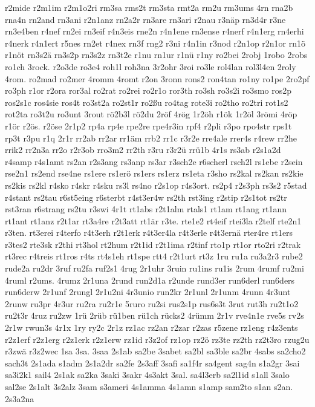 {r2mide
r2m1im
r2m1o2ri
rm3sa
rms2t
rm3sta
rmt2a
rm2u
rm3ums
4rn
rna2b
rna4n
rn2and
rn3ani
r2n1anz
rn2a2r
rn3are
rn3ari
r2nau
r3näp
rn3d4r
r3ne
rn3e4ben
r4nef
rn2ei
rn3eif
r4n3eis
rne2n
r4n1ene
rn3ense
r4nerf
r4n1erg
rn4erhi
r4nerk
r4n1ert
r5nes
rn2et
r4nex
rn3f
rng2
r3ni
r4n1in
r3nod
r2n1op
r2n1or
rn1ö
r1nöt
rn3s2ä
rn3s2p
rn3s2z
rn3t2e
r1nu
rn1ur
r1nü
r1ny
ro2bei
2robj
1robo
2robs
ro1ch
3rock.
r2o3de
ro3e4
roh1l
roh3na
3r2ohr
3roi
ro3le
rol4lan
rol3l4en
2roly
4rom.
ro2mad
ro2mer
4romm
4romt
r2on
3ronn
rons2
ron4tan
ro1ny
ro1pe
2ro2pf
ro3ph
r1or
r2ora
ror3al
ro2rat
ro2rei
ro2r1o
ror3th
ro3sh
ro3s2i
ro3smo
ros2p
ros2s1c
ros4sie
ros4t
ro3st2a
ro2st1r
ro2ßu
ro4tag
rote3i
ro2tho
ro2tri
rot1s2
rot2ta
ro3t2u
ro3unt
3rout
rö2b3l
rö2du
2röf
4rög
1r2öh
r1ök
1r2öl
3römi
4röp
r1ör
r2ös.
r2öse
2r1p2
rp4a
rp4e
rpe2re
rpe4r3in
rpf4
r2pli
r3po
rpo4str
rps1t
rp3t
r3pu
r1q
2r1r
rr2ab
rr2ar
rr1äm
rrb2
rr1c
r3r2e
rre4ale
rrer4s
r4rew
rr2he
rrik2
rr2n3a
rr2o
r2r3ob
rro3m2
rr2th
r3ru
r3r2ü
rrü1b
4r1s
rs3ab
r2s1a2d
r4samp
r4s1amt
rs2an
r2s3ang
rs3anp
rs3ar
r3sch2e
r6scherl
rsch2l
rs1ebe
r2sein
rse2n1
rs2end
rse4ne
rs1ere
rs1erö
rs1ers
rs1erz
rs1eta
r3sho
rs2kal
rs2kan
rs2kie
rs2kis
rs2kl
r4sko
r4skr
r4sku
rs3l
rs4no
r2s1op
r4s3ort.
rs2p4
r2s3ph
rs3s2
r5stad
r4stant
rs2tau
r6st5eing
r6sterbt
r4st3er4w
rs2th
rst3ing
r2stip
r2s1tot
rs2tr
rst3ran
r6strang
rs2tu
r3swi
4r1t
rt1abs
r2t1alm
rtals1
rt1am
rt1ang
rt1ann
rt1ant
rt1anz
r2t1ar
rt3a4re
r2t3att
rt1är
r3te.
rte1e2
rt4eif
rtei3la
r2telf
rte2n1
r3ten.
rt3erei
r4terfo
r4t3erh
r2t1erk
r4t3er4la
r4t3erle
r4t3ernä
rter4re
rt1ers
r3tes2
rte3sk
r2thi
rt3hol
rt2hum
r2t1id
r2t1ima
r2tinf
rto1p
rt1or
rto2ri
r2trak
rt3rec
r4treis
rt1ros
r4ts
rt4s1eh
rt1spe
rtt4
r2t1urt
rt3z
1ru
ru1a
ru3a2r3
rube2
rude2a
ru2dr
3ruf
ru2fa
ruf2s1
4rug
2r1uhr
3ruin
ru1ins
ru1is
2rum
4rumf
ru2mi
4ruml
r2ums.
4rumz
2r1una
2rund
run2d1a
r2unde
rund3er
run6derl
run6ders
run6derw
2r1unf
2rungl
2r1u2ni
4r3unio
run2kr
2r1unl
2r1unm
4runn
4r3unt
2runw
ru3pr
4r3ur
ru2ra
ru2r1e
5ruro
ru2si
rus2s1p
rus6s3t
3rut
rut3h
ru2t1o2
ru2t3r
4ruz
ru2zw
1rü
2rüb
rü1ben
rü1ch
rücks2
4rümm
2r1v
rve4n1e
rve5s
rv2s
2r1w
rwun3s
4r1x
1ry
ry2c
2r1z
rz1ac
rz2an
r2zar
r2zas
r5zene
rz1eng
r4z3ents
r2z1erf
r2z1erg
r2z1erk
r2z1erw
rz1id
r3z2of
rz1op
rz2ö
rz3te
rz2th
rz2t3ro
rzug2u
r3zwä
r3z2wec
1sa
3sa.
3saa
2s1ab
sa2be
3sabet
sa2bl
sa3ble
sa2br
4sabs
sa2cho2
sach3t
2s1ada
s1adm
2s1a2dr
sa2fe
2s3aff
3safi
sa1f4r
sa4gent
sag4n
s1a2gr
3sai
sa3i2k1
sail4
2s1ak
sa2ka
3saki
3sakr
4s3akt
3sal.
sa4l3erb
sa2l1id
s1all
3salo
sal2se
2s1alt
3s2alz
3sam
s3ameri
4s1amma
4s1amn
s1amp
sam2to
s1an
s2an.
2s3a2na
}
